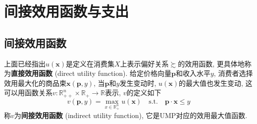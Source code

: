 \documentclass[cn, 12pt, math=mtpro2, bibstyle=apa, blue]{elegantbook}
\newcommand{\R}{\mathbb{R}}
\newcommand{\p}{\mathbf{p}}
\newcommand{\x}{\mathbf{x}}
\begin{document}
\section{间接效用函数与支出}
\subsection{间接效用函数}
上面已经指出$u(\x)$是定义在消费集$X$上表示偏好关系$\succsim$的效用函数, 更具体地称为\textbf{直接效用函数} (direct utility function). 给定价格向量$\p$和收入水平$y$, 消费者选择效用最大化的商品束$\x(\p,y)$, 当$\p$和$y$发生变动时, $u(\x)$的最大值也发生变动, 这可以用函数关系$v:\R_{++}^n\times \R_+\to \R$表示, $v$的定义如下
\begin{equation}\label{eq1.11}
  v(\p,y)=\max_{x\in\R_+^n}u(\x)\quad\text{s.t.}\quad\p\cdot\x\leq y
\end{equation}
称$v$为\textbf{间接效用函数} (indirect utility function), 它是UMP对应的效用最大值函数.
\end{document}
